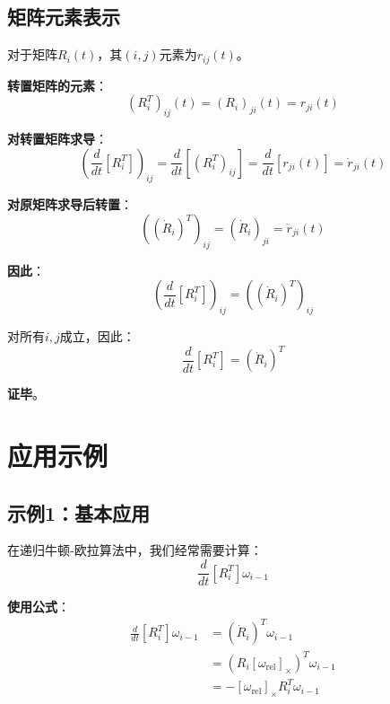 \documentclass[12pt,a4paper]{article}
\begin{document}
\subsection{矩阵元素表示}

对于矩阵$R_i(t)$，其$(i,j)$元素为$r_{ij}(t)$。

\textbf{转置矩阵的元素}：
\begin{equation}
(R_i^T)_{ij}(t) = (R_i)_{ji}(t) = r_{ji}(t)
\end{equation}

\textbf{对转置矩阵求导}：
\begin{equation}
\left(\frac{d}{dt}[R_i^T]\right)_{ij} = \frac{d}{dt}[(R_i^T)_{ij}] = \frac{d}{dt}[r_{ji}(t)] = \dot{r}_{ji}(t)
\end{equation}

\textbf{对原矩阵求导后转置}：
\begin{equation}
((\dot{R}_i)^T)_{ij} = (\dot{R}_i)_{ji} = \dot{r}_{ji}(t)
\end{equation}

\textbf{因此}：
\begin{equation}
\left(\frac{d}{dt}[R_i^T]\right)_{ij} = ((\dot{R}_i)^T)_{ij}
\end{equation}

对所有$i, j$成立，因此：
\begin{equation}
\frac{d}{dt}[R_i^T] = (\dot{R}_i)^T
\end{equation}

\textbf{证毕}。

\section{应用示例}

\subsection{示例1：基本应用}

在递归牛顿-欧拉算法中，我们经常需要计算：
\begin{equation}
\frac{d}{dt}[R_i^T] \omega_{i-1}
\end{equation}

\textbf{使用公式}：
\begin{align}
\frac{d}{dt}[R_i^T] \omega_{i-1} &= (\dot{R}_i)^T \omega_{i-1} \\
&= (R_i [\omega_{\text{rel}}]_{\times})^T \omega_{i-1} \\
&= -[\omega_{\text{rel}}]_{\times} R_i^T \omega_{i-1}
\end{align}
\end{document}
